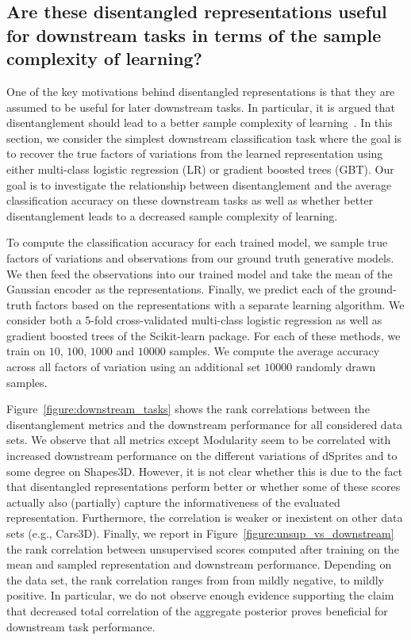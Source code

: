 \subsection{Are these disentangled representations useful for downstream tasks in terms of the sample complexity of learning?}\label{app:downstream}
One of the key motivations behind disentangled representations is that they are assumed to be useful for later downstream tasks.
In particular, it is argued that disentanglement should lead to a better sample complexity of learning~\citep{bengio2013representation,scholkopf2012causal,peters2017elements}.
In this section, we consider the simplest downstream classification task where the goal is to recover the true factors of variations from the learned representation using either multi-class logistic regression (LR) or gradient boosted trees (GBT).
Our goal is to investigate the relationship between disentanglement and the average classification accuracy on these downstream tasks as well as whether better disentanglement leads to a decreased sample complexity of learning.

To compute the classification accuracy for each trained model, we sample true factors of variations and observations from our ground truth generative models.
We then feed the observations into our trained model and take the mean of the Gaussian encoder as the representations.
Finally, we predict each of the ground-truth factors based on the representations with a separate learning algorithm.
We consider both a 5-fold cross-validated multi-class logistic regression as well as gradient boosted trees of the Scikit-learn package.
For each of these methods, we train on $\num{10}$, $\num{100}$, $\num{1000}$ and $\num{10000}$ samples.
We compute the average accuracy across all factors of variation using an additional set $\num{10000}$ randomly drawn samples.

Figure~\ref{figure:downstream_tasks} shows the rank correlations between the disentanglement metrics and the downstream performance for all considered data sets.
We observe that all metrics except Modularity seem to be correlated with increased downstream performance on the different variations of dSprites and to some degree on Shapes3D. 
However, it is not clear whether this is due to the fact that disentangled representations perform better or whether some of these scores actually also (partially) capture the informativeness of the evaluated representation. Furthermore, the correlation is weaker or inexistent on other data sets (e.g., Cars3D). Finally, we report in Figure~\ref{figure:unsup_vs_downstream} the rank correlation between unsupervised scores computed after training on the mean and sampled representation and downstream performance.
Depending on the data set, the rank correlation ranges from from mildly negative, to mildly positive.
In particular, we do not observe enough evidence supporting the claim that decreased total correlation of the aggregate posterior proves beneficial for downstream task performance. 

